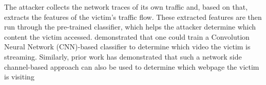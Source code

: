 The attacker collects the network traces of its own traffic and, based on that, extracts the features of the victim's traffic flow. These extracted features are then run through the pre-trained classifier, which helps the attacker determine which content the victim accessed. \citeauthor{schuster2017beautyburst} demonstrated that one could train a Convolution Neural Network (CNN)-based classifier to determine which video the victim is streaming. Similarly, prior work has demonstrated that such a network side channel-based approach can also be used to determine which webpage the victim is visiting \cite{hayes2016kfp, panchenko2016website, gong2010fingerprinting}

